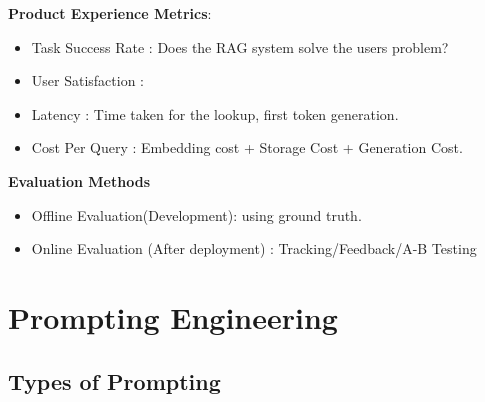 \documentclass[10pt,a4paper]{article}
\begin{document}
\textbf{Product Experience Metrics}:

\begin{itemize}

\item
  Task Success Rate : Does the RAG system solve the user\textquotesingle s problem?
\item
  User Satisfaction :
\item
  Latency : Time taken for the lookup, first token generation.
\item
  Cost Per Query : Embedding cost + Storage Cost + Generation Cost.
\end{itemize}

\textbf{Evaluation Methods}

\begin{itemize}

\item
  Offline Evaluation(Development): using ground truth.
\item
  Online Evaluation (After deployment) : Tracking/Feedback/A-B Testing
\end{itemize}

\section{Prompting Engineering}\label{prompting-engineering}

\subsection{Types of Prompting}\label{types-of-prompting}
\end{document}
